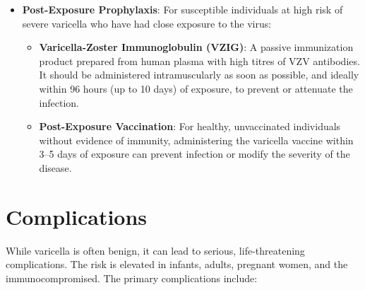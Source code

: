 \begin{itemize}
\begin{itemize}
        \item \textbf{Intravenous Antiviral Therapy}: Reserved for patients with severe disease, complications (such as varicella pneumonia or encephalitis), and immunocompromised individuals. Intravenous acyclovir is administered in a hospital setting to ensure therapeutic blood levels and monitor renal function.
    \end{itemize}
    \item \textbf{Post-Exposure Prophylaxis}: For susceptible individuals at high risk of severe varicella who have had close exposure to the virus:
    \begin{itemize}
        \item \textbf{Varicella-Zoster Immunoglobulin (VZIG)}: A passive immunization product prepared from human plasma with high titres of VZV antibodies. It should be administered intramuscularly as soon as possible, and ideally within 96 hours (up to 10 days) of exposure, to prevent or attenuate the infection.
        \item \textbf{Post-Exposure Vaccination}: For healthy, unvaccinated individuals without evidence of immunity, administering the varicella vaccine within 3--5 days of exposure can prevent infection or modify the severity of the disease.
    \end{itemize}
\end{itemize}

\section*{Complications}
While varicella is often benign, it can lead to serious, life-threatening complications. The risk is elevated in infants, adults, pregnant women, and the immunocompromised. The primary complications include:

